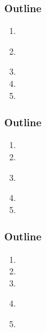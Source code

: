 \documentclass[usenames,dvipsnames]{beamer}
\begin{document}


\miniframesoff
  \begin{frame}
    \frametitle{\textbf{Outline}}
  \begin{enumerate}
    \item \introtitle
    \item \textbf{\firsttitle}
    \item \secondtitle
    \item \thirdtitle
    \item \dassault
  \end{enumerate}
  \end{frame}
\miniframeson



\miniframesoff
  \begin{frame}
    \frametitle{\textbf{Outline}}
  \begin{enumerate}
    \item \introtitle
    \item \firsttitle
    \item \textbf{\secondtitle}
    \item \thirdtitle
    \item \dassault
  \end{enumerate}
  \end{frame}
\miniframeson



\miniframesoff
  \begin{frame}
    \frametitle{\textbf{Outline}}
  \begin{enumerate}
    \item \introtitle
    \item \firsttitle
    \item \secondtitle
    \item \textbf{\thirdtitle}
    \item \dassault
  \end{enumerate}
  \end{frame}
\miniframeson
\end{document}
